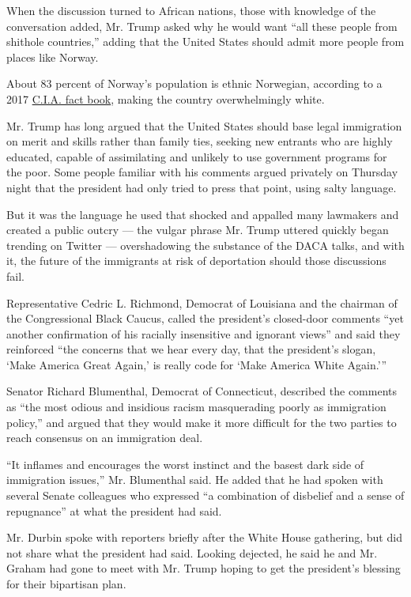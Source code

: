 When the discussion turned to African nations, those with knowledge of
the conversation added, Mr. Trump asked why he would want ``all these
people from shithole countries,'' adding that the United States should
admit more people from places like Norway.

About 83 percent of Norway's population is ethnic Norwegian, according
to a 2017
\href{https://www.cia.gov/library/publications/the-world-factbook/geos/no.html}{C.I.A.
fact book}, making the country overwhelmingly white.

Mr. Trump has long argued that the United States should base legal
immigration on merit and skills rather than family ties, seeking new
entrants who are highly educated, capable of assimilating and unlikely
to use government programs for the poor. Some people familiar with his
comments argued privately on Thursday night that the president had only
tried to press that point, using salty language.

But it was the language he used that shocked and appalled many lawmakers
and created a public outcry --- the vulgar phrase Mr. Trump uttered
quickly began trending on Twitter --- overshadowing the substance of the
DACA talks, and with it, the future of the immigrants at risk of
deportation should those discussions fail.

Representative Cedric L. Richmond, Democrat of Louisiana and the
chairman of the Congressional Black Caucus, called the president's
closed-door comments ``yet another confirmation of his racially
insensitive and ignorant views'' and said they reinforced ``the concerns
that we hear every day, that the president's slogan, `Make America Great
Again,' is really code for `Make America White Again.'''

Senator Richard Blumenthal, Democrat of Connecticut, described the
comments as ``the most odious and insidious racism masquerading poorly
as immigration policy,'' and argued that they would make it more
difficult for the two parties to reach consensus on an immigration deal.

``It inflames and encourages the worst instinct and the basest dark side
of immigration issues,'' Mr. Blumenthal said. He added that he had
spoken with several Senate colleagues who expressed ``a combination of
disbelief and a sense of repugnance'' at what the president had said.

Mr. Durbin spoke with reporters briefly after the White House gathering,
but did not share what the president had said. Looking dejected, he said
he and Mr. Graham had gone to meet with Mr. Trump hoping to get the
president's blessing for their bipartisan plan.

